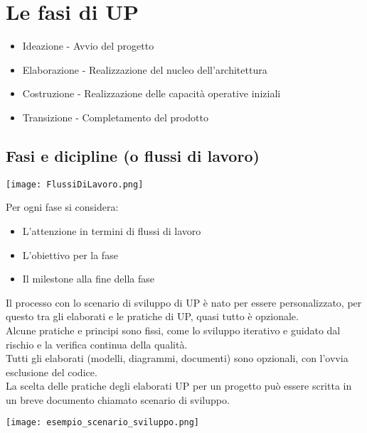  \section{Le fasi di UP}
 \begin{itemize}
    \item Ideazione - Avvio del progetto
    \item Elaborazione - Realizzazione del nucleo dell'architettura
    \item Costruzione - Realizzazione delle capacità operative iniziali
    \item Transizione - Completamento del prodotto
 \end{itemize}
\subsection{Fasi e dicipline (o flussi di lavoro)}
\begin{center}
    \texttt{[image: FlussiDiLavoro.png]}
\end{center}
Per ogni fase si considera:
\begin{itemize}
    \item L'attenzione in termini di flussi di lavoro
    \item L'obiettivo per la fase
    \item Il milestone alla fine della fase
\end{itemize}
Il processo con lo scenario di sviluppo di UP è nato per essere personalizzato,
per questo tra gli elaborati e le pratiche di UP, quasi tutto è opzionale.
\\ Alcune pratiche e principi sono fissi, come lo sviluppo iterativo e guidato dal rischio
e la verifica continua della qualità.
\\ Tutti gli elaborati (modelli, diagrammi, documenti) sono opzionali, con l'ovvia
esclusione del codice.
\\ La scelta delle pratiche degli elaborati UP per un progetto può essere scritta in un
breve documento chiamato scenario di sviluppo.
\begin{center}
    \texttt{[image: esempio\_scenario\_sviluppo.png]}
\end{center}
